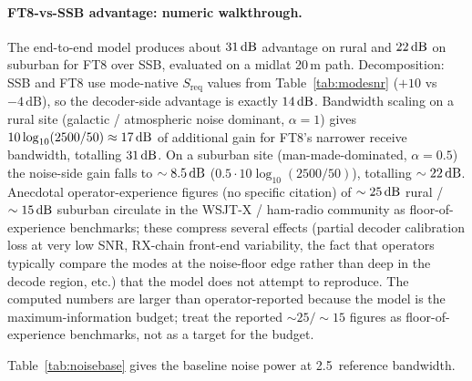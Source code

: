 \documentclass[11pt,a4paper]{article}
\newcommand{\SI}[2]{#1\,\text{#2}}
\newcommand{\dB}{\text{dB}}
\newcommand{\kHz}{\text{kHz}}
\begin{document}
\paragraph{FT8-vs-SSB advantage: numeric walkthrough.}
The end-to-end model produces about $\SI{31}{\dB}$ advantage on
rural and $\SI{22}{\dB}$ on suburban for FT8 over SSB, evaluated
on a midlat 20\,m path.  Decomposition: SSB and FT8 use mode-native
$S_{\text{req}}$ values from Table~\ref{tab:modesnr} ($+10$ vs
$-4\,\dB$), so the decoder-side advantage is exactly $\SI{14}{\dB}$.
Bandwidth scaling on a rural site (galactic / atmospheric noise
dominant, $\alpha = 1$) gives $10\log_{10}(2500/50) \approx
\SI{17}{\dB}$ of additional gain for FT8's narrower receive
bandwidth, totalling $\SI{31}{\dB}$.  On a suburban site
(man-made-dominated, $\alpha = 0.5$) the noise-side gain falls to
$\sim\SI{8.5}{\dB}$ ($0.5 \cdot 10\log_{10}(2500/50)$), totalling
$\sim\SI{22}{\dB}$.  Anecdotal
operator-experience figures (no specific citation) of
$\sim\SI{25}{\dB}$ rural / $\sim\SI{15}{\dB}$ suburban
circulate in the WSJT-X / ham-radio community as floor-of-
experience benchmarks; these compress several effects (partial
decoder calibration loss at very low SNR, RX-chain front-end
variability, the fact that operators typically compare the
modes at the noise-floor edge rather than deep in the decode
region, etc.) that the model does not attempt to reproduce.  The computed numbers are larger than
operator-reported because the model is the maximum-information
budget; treat the reported $\sim\!25 / \sim\!15$ figures as
floor-of-experience benchmarks, not as a target for the budget.

Table~\ref{tab:noisebase} gives the baseline noise power at
\SI{2.5}{\kHz} reference bandwidth.
\end{document}
